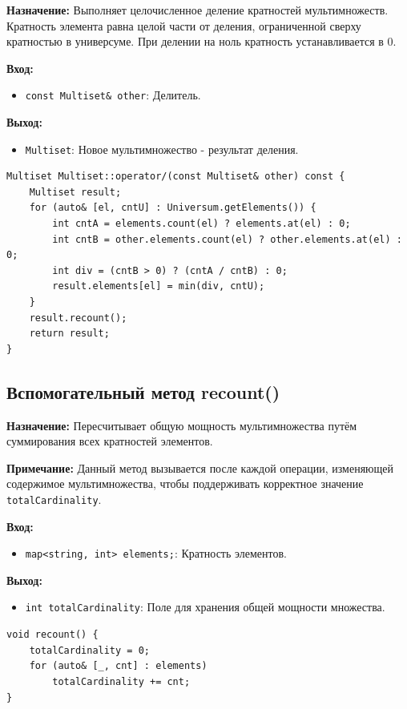 \textbf{Назначение:} Выполняет целочисленное деление кратностей мультимножеств. Кратность элемента равна целой части от деления, ограниченной сверху кратностью в универсуме. При делении на ноль кратность устанавливается в 0.

\textbf{Вход:}
\begin{itemize}
    \item \texttt{const Multiset\& other}: Делитель.
\end{itemize}

\textbf{Выход:}
\begin{itemize}
    \item \texttt{Multiset}: Новое мультимножество - результат деления.
\end{itemize}

\begin{lstlisting}[style=cstyle, caption={Реализация operator/()}]
Multiset Multiset::operator/(const Multiset& other) const {
    Multiset result;
    for (auto& [el, cntU] : Universum.getElements()) {
        int cntA = elements.count(el) ? elements.at(el) : 0;
        int cntB = other.elements.count(el) ? other.elements.at(el) : 0;
        int div = (cntB > 0) ? (cntA / cntB) : 0;
        result.elements[el] = min(div, cntU);
    }
    result.recount();
    return result;
}
\end{lstlisting}

\subsection{Вспомогательный метод recount()}

\textbf{Назначение:} Пересчитывает общую мощность мультимножества путём суммирования всех кратностей элементов.

\textbf{Примечание:} Данный метод вызывается после каждой операции, изменяющей содержимое мультимножества, чтобы поддерживать корректное значение \texttt{totalCardinality}.

\textbf{Вход:}
\begin{itemize}
    \item \texttt{map<string, int> elements;}: Кратность элементов.
\end{itemize}

\textbf{Выход:}
\begin{itemize}
    \item \texttt{int totalCardinality}: Поле для хранения общей мощности множества.
\end{itemize}

\begin{lstlisting}[style=cstyle, caption={Реализация recount()}]
void recount() {
    totalCardinality = 0;
    for (auto& [_, cnt] : elements)
        totalCardinality += cnt;
}
\end{lstlisting}